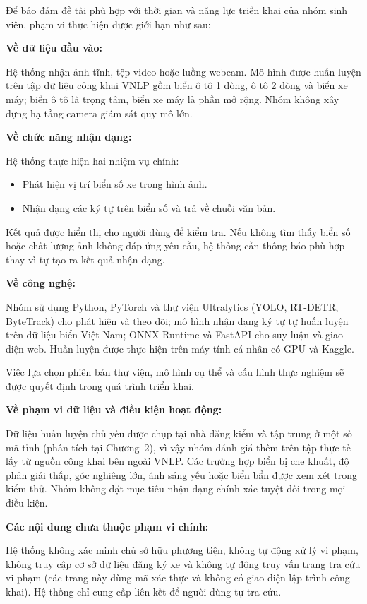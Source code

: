Để bảo đảm đề tài phù hợp với thời gian và năng lực triển khai của nhóm sinh viên, phạm vi thực hiện được giới hạn như sau:

\noindent\textbf{Về dữ liệu đầu vào:}
\nopagebreak

Hệ thống nhận ảnh tĩnh, tệp video hoặc luồng webcam. Mô hình được huấn luyện trên tập dữ liệu công khai VNLP gồm biển ô tô 1 dòng, ô tô 2 dòng và biển xe máy; biển ô tô là trọng tâm, biển xe máy là phần mở rộng. Nhóm không xây dựng hạ tầng camera giám sát quy mô lớn.

\noindent\textbf{Về chức năng nhận dạng:}
\nopagebreak

Hệ thống thực hiện hai nhiệm vụ chính:

\begin{itemize}
  \item Phát hiện vị trí biển số xe trong hình ảnh.
  \item Nhận dạng các ký tự trên biển số và trả về chuỗi văn bản.
\end{itemize}

Kết quả được hiển thị cho người dùng để kiểm tra. Nếu không tìm thấy biển số hoặc chất lượng ảnh không đáp ứng yêu cầu, hệ thống cần thông báo phù hợp thay vì tự tạo ra kết quả nhận dạng.

\noindent\textbf{Về công nghệ:}
\nopagebreak

Nhóm sử dụng Python, PyTorch và thư viện Ultralytics (YOLO, RT-DETR, ByteTrack) cho phát hiện và theo dõi; mô hình nhận dạng ký tự tự huấn luyện trên dữ liệu biển Việt Nam; ONNX Runtime và FastAPI cho suy luận và giao diện web. Huấn luyện được thực hiện trên máy tính cá nhân có GPU và Kaggle.

Việc lựa chọn phiên bản thư viện, mô hình cụ thể và cấu hình thực nghiệm sẽ được quyết định trong quá trình triển khai.

\noindent\textbf{Về phạm vi dữ liệu và điều kiện hoạt động:}
\nopagebreak

Dữ liệu huấn luyện chủ yếu được chụp tại nhà đăng kiểm và tập trung ở một số mã tỉnh (phân tích tại Chương~2), vì vậy nhóm đánh giá thêm trên tập thực tế lấy từ nguồn công khai bên ngoài VNLP. Các trường hợp biển bị che khuất, độ phân giải thấp, góc nghiêng lớn, ánh sáng yếu hoặc biển bẩn được xem xét trong kiểm thử. Nhóm không đặt mục tiêu nhận dạng chính xác tuyệt đối trong mọi điều kiện.

\noindent\textbf{Các nội dung chưa thuộc phạm vi chính:}
\nopagebreak

Hệ thống không xác minh chủ sở hữu phương tiện, không tự động xử lý vi phạm, không truy cập cơ sở dữ liệu đăng ký xe và không tự động truy vấn trang tra cứu vi phạm (các trang này dùng mã xác thực và không có giao diện lập trình công khai). Hệ thống chỉ cung cấp liên kết để người dùng tự tra cứu.

